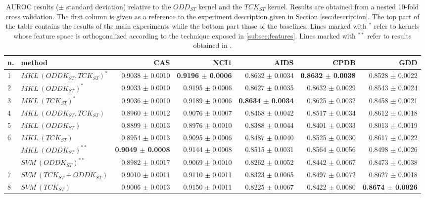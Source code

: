 \begin{landscape}
    \begin{table}[ht]\footnotesize
        \centering
        \begin{tabular}{|l|l|r|r|r|r|r|}
            \hline
            n. &method&CAS&NCI1&AIDS&CPDB&GDD\\
            \hline
            1& $MKL~(ODDK_{ST}, TCK_{ST})^*$&0.9038 $\pm$ 0.0010&\textbf{0.9196 $\pm$ 0.0006}&0.8632 $\pm$ 0.0034&\textbf{0.8632 $\pm$ 0.0038}&0.8528 $\pm$ 0.0022\\
            2& $MKL~(ODDK_{ST})^*$&0.9033 $\pm$ 0.0010&0.9195 $\pm$ 0.0006&0.8627 $\pm$ 0.0035&0.8632 $\pm$  0.0029&0.8543 $\pm$ 0.0024\\
            3& $MKL~(TCK_{ST})^*$&0.9036 $\pm$ 0.0010&0.9189 $\pm$ 0.0006&\textbf{0.8634 $\pm$ 0.0034}&0.8625 $\pm$ 0.0032&0.8458 $\pm$ 0.0021\\
            \hline
            4& $MKL~(ODDK_{ST}, TCK_{ST})$&0.8960 $\pm$  0.0012&0.9076 $\pm$ 0.0007&0.8468 $\pm$ 0.0042&0.8517 $\pm$ 0.0034&0.8612 $\pm$ 0.0018\\
            5& $MKL~(ODDK_{ST})$&0.8899 $\pm$ 0.0013&0.8976 $\pm$ 0.0010 &0.8388 $\pm$ 0.0044&0.8401 $\pm$ 0.0033&0.8013 $\pm$ 0.0019\\
            6& $MKL~(TCK_{ST})$&0.8954 $\pm$ 0.0013&0.9095 $\pm$ 0.0006&0.8487 $\pm$ 0.0040&0.8525 $\pm$ 0.0030&0.8617 $\pm$ 0.0022\\
            \hline
             & $MKL~(ODDK_{ST})^{**}$&\textbf{0.9049 $\pm$ 0.0008}&0.9144 $\pm$ 0.0008&0.8515 $\pm$ 0.0031&0.8564 $\pm$ 0.0056&0.8498 $\pm$ 0.0026\\
             & $SVM~(ODDK_{ST})^{**}$&0.8982 $\pm$ 0.0017&0.9069 $\pm$ 0.0010&0.8262 $\pm$ 0.0052&0.8442 $\pm$ 0.0067&0.8473 $\pm$ 0.0038\\
            \hline
            7& $SVM~(TCK_{ST} + ODDK_{ST})$&0.9010 $\pm$ 0.0011&0.9110 $\pm$ 0.0011&0.8323 $\pm$ 0.0065&0.8497 $\pm$ 0.0072&0.8627 $\pm$ 0.0018\\
            8& $SVM~(TCK_{ST})$&0.9006 $\pm$ 0.0013&0.9150 $\pm$ 0.0011&0.8225 $\pm$ 0.0067&0.8422 $\pm$ 0.0080&\textbf{0.8674 $\pm$ 0.0026}\\
            \hline
        \end{tabular}
        \caption{\footnotesize AUROC results ($\pm$ standard deviation) relative
            to the $ODD_{ST}$ kernel and the $TCK_{ST}$ kernel. Results are
            obtained from a nested 10-fold cross validation. The first column is
            given as a reference to the experiment description given in Section
            \ref{sec:description}.
            The top part of the table contains the results of the main experiments
            while the bottom part those of the baselines.
            Lines marked with $^*$ refer to kernels whose feature space is orthogonalized
            according to the technique exposed in \ref{subsec:features}.
            Lines marked with $^{**}$ refer to results obtained in \cite{gmkl}.
        }
        \label{table:results_st}
        \medskip


\end{table}
\end{landscape}
